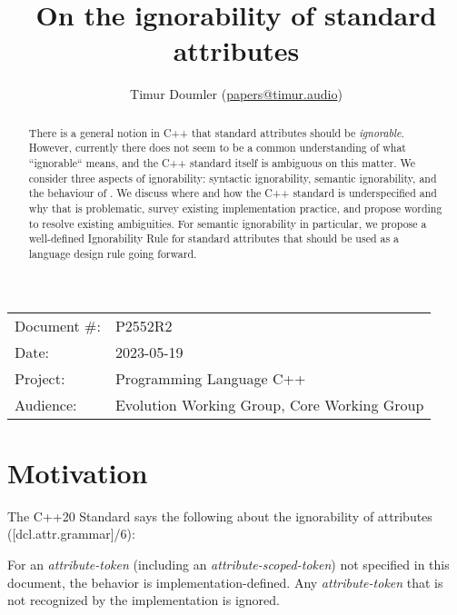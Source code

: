 

\newcommand{\forceindent}{\parindent=1em\indent\parindent=0pt\relax} %


\title{On the ignorability of standard attributes}
\author{
  Timur Doumler \small(\href{mailto:papers@timur.audio}{papers@timur.audio})
}
\date{}
\maketitle

\begin{tabular}{ll}
Document \#: & P2552R2 \\
Date: & 2023-05-19\\
Project: & Programming Language C++ \\
Audience: & Evolution Working Group, Core Working Group
\end{tabular}


\begin{abstract}
There is a general notion in C++ that standard attributes should be \emph{ignorable}. However, currently there does not seem to be a common understanding of what ``ignorable`` means, and the C++ standard itself is ambiguous on this matter. We consider three aspects of ignorability: syntactic ignorability, semantic ignorability, and the behaviour of \mbox{}. We discuss where and how the C++ standard is underspecified and why that is problematic, survey existing implementation practice, and propose wording to resolve existing ambiguities. For semantic ignorability in particular, we propose a well-defined Ignorability Rule for standard attributes that should be used as a language design rule going forward.
\end{abstract}


\section{Motivation}
\label{sec:motivation}


The C++20 Standard says the following about the ignorability of attributes ([dcl.attr.grammar]/6):

\begin{adjustwidth}{0.5cm}{0.5cm}
For an \emph{attribute-token} (including an \emph{attribute-scoped-token})  not specified in this document, the behavior is implementation-defined. Any \emph{attribute-token} that is not recognized by the implementation is ignored.
\end{adjustwidth}

